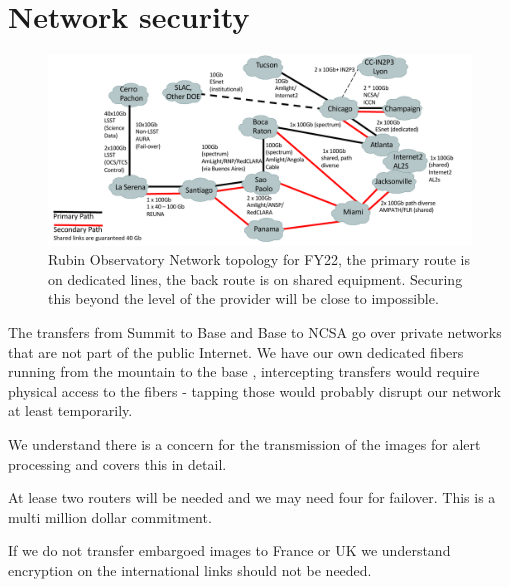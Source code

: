 

\section{Network security}\label{sec:net}

\begin{figure}
\begin{center}
\includegraphics[width=1.0\textwidth]{NetworksFY22}
\caption{Rubin Observatory Network topology for FY22, the primary route is on dedicated lines, the back route is on shared equipment. Securing this beyond the level of the provider will be close to impossible.  \label{fig:net}}
\end{center}
\end{figure}


The transfers from Summit to Base and Base to NCSA go over private networks that are not part of the public Internet. We have our own dedicated fibers running from the mountain to the base ,
intercepting transfers would require physical access to the fibers - tapping those would probably disrupt our network at least temporarily.

We understand there is a concern for the transmission of the images for alert processing and
  covers this in detail.

{At lease two routers will be needed and we may need four for failover. This is a multi million dollar commitment. }

If we do not transfer embargoed images to France or UK we understand encryption on the international links should not be needed.



